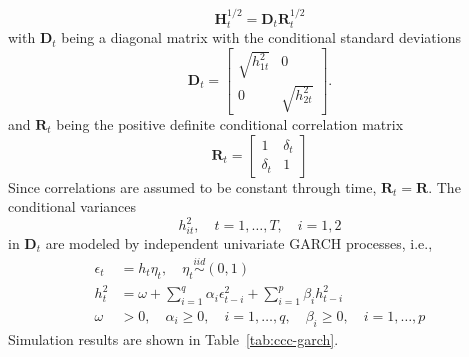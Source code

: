 \documentclass{article}
\begin{document}
\begin{equation}
\boldsymbol{H}_{t}^{1/2} = \boldsymbol{D}_{t} \boldsymbol{R}_{t}^{1 / 2}
\end{equation}
with $\boldsymbol{D}_{t}$ being a diagonal matrix with the conditional standard deviations 
\begin{equation}
\label{eqn:40}
\boldsymbol{D}_{t}=\left[\begin{array}{cc}{\sqrt{h_{1 t}^{2}}} & {0} \\ {0} & {\sqrt{h_{2 t}^{2}}}\end{array}\right].
\end{equation}
and $\boldsymbol{R}_{t}$ being the positive definite conditional correlation matrix 
\begin{equation}
\boldsymbol{R}_{t}=\left[\begin{array}{cc}{1} & {\delta_{ t}} \\ {\delta_{ t}} & {1}\end{array}\right]
\end{equation}
Since correlations are assumed to be constant through time, $\boldsymbol{R}_{t}=\boldsymbol{R}$. The conditional variances 
$${h}_{i t}^{2}, \quad t=1, \ldots, T, \quad i=1, 2$$
in $\boldsymbol{D}_{t}$ are modeled by independent univariate GARCH processes, i.e.,
\begin{equation}
\begin{aligned} \epsilon_{t} &=h_{t} \eta_{t}, \quad \eta_{t} \stackrel{i i d}{\sim}(0,1) \\ h_{t}^{2} &=\omega+\sum_{i=1}^{q} \alpha_{i} \epsilon_{t-i}^{2}+\sum_{i=1}^{p} \beta_{i} h_{t-i}^{2} \\ \omega &>0, \quad \alpha_{i} \geq 0, \quad i=1, \ldots, q, \quad \beta_{i} \geq 0, \quad i=1, \ldots, p \end{aligned}
\end{equation}
Simulation results are shown in Table~\vref{tab:ccc-garch}.
\end{document}
